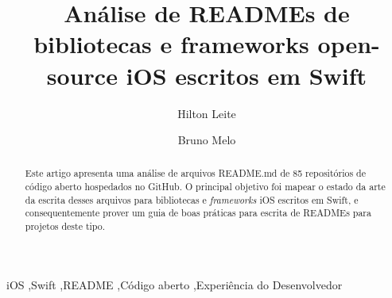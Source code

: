 \documentclass[preprint,12pt,authoryear]{elsarticle}
\begin{document}
\begin{frontmatter}



\title{Análise de READMEs de bibliotecas e frameworks open-source iOS escritos em Swift}


\author{Hilton Leite}

\author{Bruno Melo}


\begin{abstract}
Este artigo apresenta uma análise de arquivos README.md de 85 repositórios de código aberto hospedados no GitHub. O principal objetivo foi mapear o estado da arte da escrita desses arquivos para bibliotecas e \textit{frameworks} iOS escritos em Swift, e consequentemente prover um guia de boas práticas para escrita de READMEs para projetos deste tipo.  
\end{abstract}

\begin{keyword}
iOS \sep Swift \sep README \sep Código aberto \sep Experiência do Desenvolvedor


\end{keyword}

\end{frontmatter}

\end{document}
